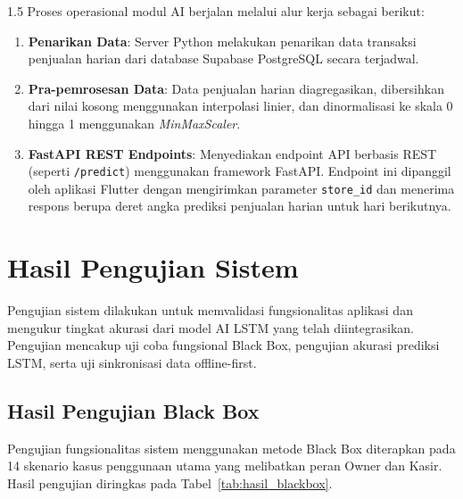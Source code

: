 \documentclass[12pt, a4paper, onecolumn, oneside]{report}
\begin{document}
\begin{spacing}{1.5}
Proses operasional modul AI berjalan melalui alur kerja sebagai berikut:
\begin{enumerate}
    \item \textbf{Penarikan Data}: Server Python melakukan penarikan data transaksi penjualan harian dari database Supabase PostgreSQL secara terjadwal.
    \item \textbf{Pra-pemrosesan Data}: Data penjualan harian diagregasikan, dibersihkan dari nilai kosong menggunakan interpolasi linier, dan dinormalisasi ke skala 0 hingga 1 menggunakan \textit{MinMaxScaler}.
    \item \textbf{FastAPI REST Endpoints}: Menyediakan endpoint API berbasis REST (seperti \texttt{/predict}) menggunakan framework FastAPI. Endpoint ini dipanggil oleh aplikasi Flutter dengan mengirimkan parameter \texttt{store\_id} dan menerima respons berupa deret angka prediksi penjualan harian untuk hari berikutnya.
\end{enumerate}

\section{Hasil Pengujian Sistem}

Pengujian sistem dilakukan untuk memvalidasi fungsionalitas aplikasi dan mengukur tingkat akurasi dari model AI LSTM yang telah diintegrasikan. Pengujian mencakup uji coba fungsional Black Box, pengujian akurasi prediksi LSTM, serta uji sinkronisasi data offline-first.

\subsection{Hasil Pengujian Black Box}

Pengujian fungsionalitas sistem menggunakan metode Black Box diterapkan pada 14 skenario kasus penggunaan utama yang melibatkan peran Owner dan Kasir. Hasil pengujian diringkas pada Tabel~\ref{tab:hasil_blackbox}.


\end{spacing}
\end{document}
